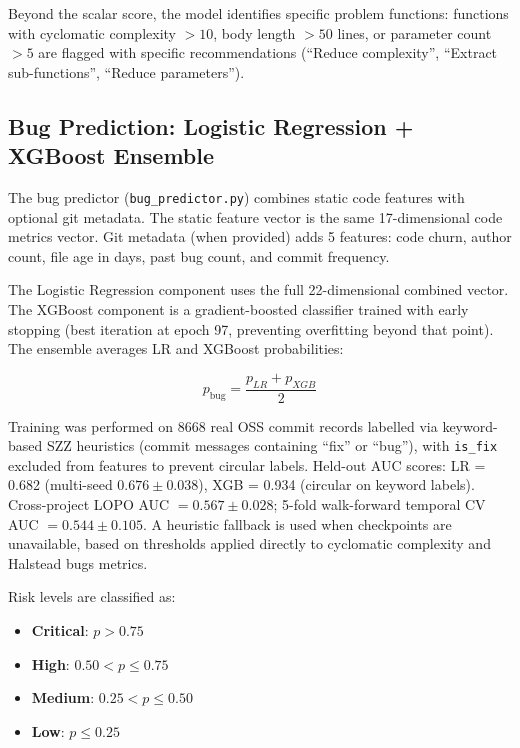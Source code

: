 \documentclass[12pt, oneside]{report}
\begin{document}
Beyond the scalar score, the model identifies specific problem functions: functions
with cyclomatic complexity $> 10$, body length $> 50$ lines, or parameter count $> 5$
are flagged with specific recommendations (``Reduce complexity'', ``Extract sub-functions'',
``Reduce parameters'').

\subsection{Bug Prediction: Logistic Regression + XGBoost Ensemble}
\label{ssec:bugs}

The bug predictor (\texttt{bug\_predictor.py}) combines static code features with optional
git metadata. The static feature vector is the same 17-dimensional code metrics vector.
Git metadata (when provided) adds 5 features: code churn, author count, file age in days,
past bug count, and commit frequency.

The Logistic Regression component uses the full 22-dimensional combined vector. The XGBoost
component is a gradient-boosted classifier trained with early stopping (best iteration at
epoch 97, preventing overfitting beyond that point). The ensemble averages LR and XGBoost
probabilities:

\begin{equation}
  p_{\text{bug}} = \frac{p_{LR} + p_{XGB}}{2}
\end{equation}

Training was performed on 8668 real OSS commit records labelled via keyword-based SZZ
heuristics (commit messages containing ``fix'' or ``bug''), with \texttt{is\_fix} excluded
from features to prevent circular labels. Held-out AUC scores: LR = 0.682 (multi-seed
$0.676 \pm 0.038$), XGB = 0.934 (circular on keyword labels). Cross-project LOPO AUC
$= 0.567 \pm 0.028$; 5-fold walk-forward temporal CV AUC $= 0.544 \pm 0.105$.
A heuristic fallback is used when checkpoints are unavailable, based on thresholds applied
directly to cyclomatic complexity and Halstead bugs metrics.

Risk levels are classified as:
\begin{itemize}
  \item \textbf{Critical}: $p > 0.75$
  \item \textbf{High}: $0.50 < p \leq 0.75$
  \item \textbf{Medium}: $0.25 < p \leq 0.50$
  \item \textbf{Low}: $p \leq 0.25$
\end{itemize}
\end{document}
